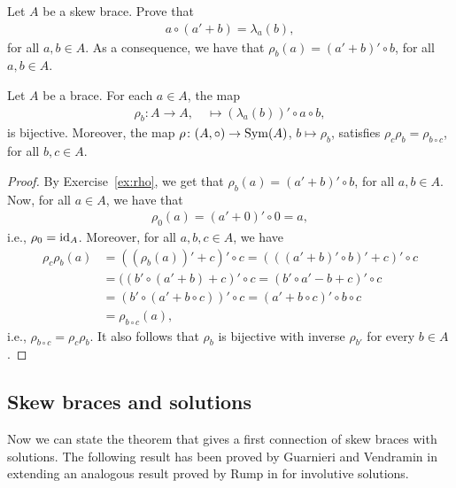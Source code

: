     \begin{exercise}\label{ex:rho}
        Let $A$ be a skew brace. Prove that 
        \begin{align*}
            a\circ(a'+b) = \lambda_a(b),
        \end{align*}
        for all $a,b\in A$. As a consequence, we have that $\rho_b(a)=(a'+b)'\circ b$, for all $a,b\in A$.
    \end{exercise}

    \begin{proposition}\label{prop:rho}
        Let $A$ be a brace. For each $a\in A$, the map
        \begin{align*}
            \rho_b\colon A\to A,\quad
            \mapsto (\lambda_a(b))'\circ a\circ b,
        \end{align*}
        is bijective. Moreover, the map 
        $\rho\colon (A,\circ)\to\operatorname{Sym}(A)$, $b\mapsto\rho_b$, satisfies $\rho_c\rho_b=\rho_{b\circ c}$, for all $b,c\in A$. 
    \end{proposition}

    \begin{proof}
    By Exercise~\ref{ex:rho}, we get that $\rho_b(a)=(a'+b)'\circ b$, for all $a,b\in A$.
    Now, for all $a\in A$, we have that 
    \begin{align*}
        \rho_0(a) = (a'+0)'\circ 0 = a,
    \end{align*}
    i.e., $\rho_0=\operatorname{id}_A$. Moreover, for all $a,b,c\in A$, we have
    \begin{align*}
        \rho_c\rho_b(a)&=((\rho_b(a))'+c)'\circ c
        = (((a'+b)'\circ b)' + c)' \circ c\\
        &= ((b'\circ (a'+b) + c)'\circ c
        = (b'\circ a' - b + c)' \circ c\\
        &= (b'\circ(a' +b\circ c))'\circ c
        = (a' +b\circ c)'\circ b \circ c\\
        &= \rho_{b\circ c}(a),
    \end{align*}
    i.e., $\rho_{b\circ c} = \rho_c\rho_b$. It also follows that $\rho_b$ is bijective with inverse $\rho_{b'}$ for every $b\in A$.
    \end{proof}

    \subsection{Skew braces and solutions}
    
    Now we can state the theorem that gives a first connection of skew braces with solutions. 
    The following result has been proved by Guarnieri and Vendramin in \cite{MR3647970} extending an analogous result proved by Rump in \cite{MR2278047} for involutive solutions.  

